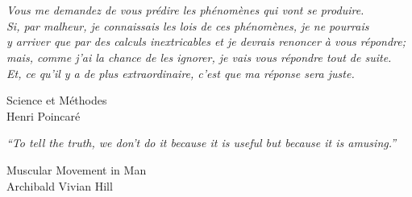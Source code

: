 
\chapter*{}
\vspace{-2cm}
\emph{\guillemotleft Vous me demandez de vous pr\'{e}dire les ph\'{e}nom\`{e}nes qui vont se produire. \\
Si, par malheur, je connaissais les lois de ces ph\'{e}nom\`{e}nes, je ne pourrais\\ y arriver que par des calculs inextricables et je devrais renoncer \`{a} vous r\'{e}pondre; \\
mais, comme j'ai la chance de les ignorer, je vais vous r\'{e}pondre tout de suite. \\
Et, ce qu'il y a de plus extraordinaire, c'est que ma r\'{e}ponse sera juste.\guillemotright} \\
\begin{flushright}
Science et M\'{e}thodes\\ Henri Poincar\'{e}
\end{flushright}
\vspace{5cm}

\emph{``To tell the truth, we don't do it because it is useful but because it is amusing.''} \\
\begin{flushright}
Muscular Movement in Man \\ Archibald Vivian Hill
\end{flushright}
\vfill
